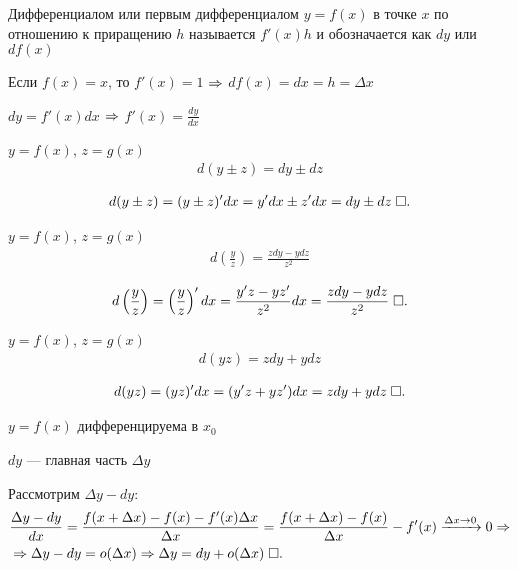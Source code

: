\documentclass{article}
\begin{document}


Дифференциалом или первым дифференциалом $y=f(x)$ в точке $x$ по отношению к приращению $h$ называется $f'(x)h$ и обозначается как $dy$ или $df(x)$

Если $f(x)=x$, то $f'(x)=1$ $\Rarr$ $df(x)=dx=h=\Delta x$

$dy=f'(x)dx$ $\Rarr$ $f'(x)=\frac{dy}{dx}$



\theorem

$y=f(x)$, $z=g(x)$
\begin{align*}
	d(y\pm z)=dy\pm dz
\end{align*}

\proof
\begin{align*}
	d(y\pm z)=(y\pm z)'dx =y'dx\pm z'dx=dy\pm dz\qed
\end{align*}

\theorem

$y=f(x)$, $z=g(x)$
\begin{align*}
	d\left(\frac{y}{z}\right)=\frac{zdy-ydz}{z^{2}}
\end{align*}

\proof
\begin{align*}
	d\left(\frac{y}{z}\right)=\left(\frac{y}{z}\right)'dx =\frac{y'z-yz'}{z^{2}}dx=\frac{zdy-ydz}{z^{2}}\qed
\end{align*}

\theorem

$y=f(x)$, $z=g(x)$
\begin{align*}
	d(yz)=zdy+ydz
\end{align*}

\proof
\begin{align*}
	d(yz)=(yz)'dx=(y'z+yz')dx=zdy+ydz\qed
\end{align*}

\pagebreak

\theorem

$y=f(x)$ дифференцируема в $x_0$

$dy$ --- главная часть $\Delta y$

\proof

Рассмотрим $\Delta y-dy$:
\begin{align*}
	 & \frac{\Delta y-dy}{dx}=\frac{f(x+\Delta x)-f(x)-f'(x)\Delta x}{\Delta x}=\frac{f(x+\Delta x)-f(x)}{\Delta x}-f'(x)\xrightarrow{\Delta x\to 0}0\Rarr \\
	 & \Rarr\Delta y-dy=o(\Delta x)\Rarr \Delta y=dy+o(\Delta x)\qed
\end{align*}
\end{document}
